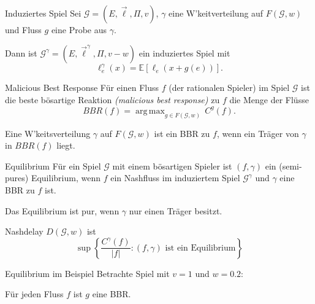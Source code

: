 \documentclass{beamer}
\DeclareMathOperator*{\argmax}{arg\,max}
\begin{document}
\begin{frame}{Induziertes Spiel}
	Sei $\mathcal G = (E, \vec{\ell}, \Pi, v)$, $\gamma$ eine W'keitverteilung auf $F(\mathcal G, w)$ und Fluss $g$ eine Probe aus $\gamma$. 
	
	Dann ist $\mathcal G^\gamma = (E, \vec{\ell}^\gamma, \Pi, v-w)$ ein \alert{induziertes Spiel} mit 
	\[ \ell_e^\gamma(x) = \mathbb E[\ell_e(x+ g(e))] .\]
\end{frame}


\begin{frame}{Malicious Best Response}
	Für einen Fluss $f$ (der rationalen Spieler) im Spiel $\mathcal G$ ist die \alert{beste bösartige Reaktion} \emph{(malicious best response)} zu $f$ die Menge der Flüsse
	\[ BBR(f) = \argmax_{g \in F(\mathcal G, w)} \, C^g(f) .\]
	
	Eine W'keitsverteilung $\gamma$ auf $F(\mathcal G, w)$ ist ein BBR zu $f$, wenn ein Träger von $\gamma$ in $BBR(f)$ liegt.
\end{frame}

\begin{frame}{Equilibrium}
	Für ein Spiel $\mathcal G$ mit einem bösartigen Spieler ist $(f, \gamma)$ ein (semi-pures) \alert{Equilibrium}, wenn $f$ ein Nashfluss im induziertem Spiel $\mathcal G^\gamma$ und $\gamma$ eine BBR zu $f$ ist. 
	
	Das Equilibrium ist \alert{pur}, wenn $\gamma$ nur einen Träger besitzt.
	
	Nashdelay $D(\mathcal G, w)$ ist
	\[
		\sup \left\{\frac{C^\gamma(f)}{|f|} : (f,\gamma) \text{ ist ein Equilibrium} \right\}
	\]
\end{frame}

\begin{frame}{Equilibrium im Beispiel}
	Betrachte Spiel mit $v=1$ und $w=0.2$:
	
	\begin{figure}
	\end{figure}
	Für jeden Fluss $f$ ist $g$ eine BBR.
\end{frame}
\end{document}
